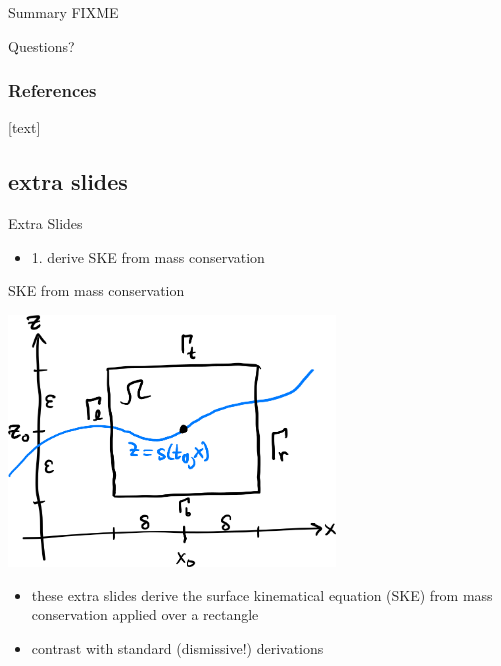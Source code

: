 \documentclass[10pt,dvipsnames]{beamer}
\begin{document}
\begin{frame}{Summary}
FIXME
\end{frame}

\begin{frame}[standout]
  Questions?
\end{frame}


\appendix



\begin{frame}[allowframebreaks]
\frametitle{References}
[text]

  
  
\end{frame}


\subsection[]{extra slides}


\begin{frame}[standout]
Extra Slides

\begin{itemize}
\item 1. derive SKE from mass conservation
\end{itemize}
\end{frame}

\begin{frame}{SKE from mass conservation}
\begin{center}
\includegraphics[width=0.65\textwidth]{skederive.png}
\end{center}

\begin{itemize}
\item these extra slides derive the surface kinematical equation (SKE) from mass conservation applied over a rectangle
\item contrast with standard (dismissive!) derivations \cite{GreveBlatter2009,SchoofHewitt2013}
\end{itemize}
\end{frame}
\end{document}
